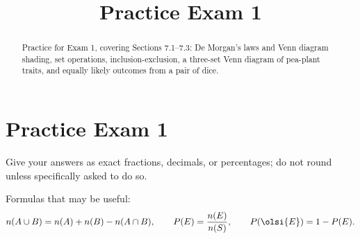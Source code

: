 \documentclass[12pt]{ximera}
\title{Practice Exam 1}
\begin{document}
\begin{abstract}
Practice for Exam 1, covering Sections 7.1--7.3: De Morgan's laws and Venn diagram shading, set
operations, inclusion-exclusion, a three-set Venn diagram of pea-plant traits, and
equally likely outcomes from a pair of dice.
\end{abstract}
\maketitle

\section*{Practice Exam 1}

Give your answers as exact fractions, decimals, or percentages; do not round unless
specifically asked to do so.

Formulas that may be useful:
\[
n(A\cup B) = n(A) + n(B) - n(A\cap B), \qquad
P(E) = \frac{n(E)}{n(S)}, \qquad
P\!\left(\olsi{E}\right)=1-P(E).
\]
\end{document}
